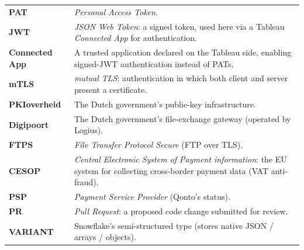 \begin{longtable}{@{}>{\bfseries}p{3.2cm} p{\dimexpr\textwidth-3.2cm-2\tabcolsep\relax}@{}}
PAT & \emph{Personal Access Token}. \\
JWT & \emph{JSON Web Token}: a signed token, used here via a Tableau \emph{Connected App} for authentication. \\
Connected App & A trusted application declared on the Tableau side, enabling signed-JWT authentication instead of PATs. \\
mTLS & \emph{mutual TLS}: authentication in which both client and server present a certificate. \\
PKIoverheid & The Dutch government's public-key infrastructure. \\
Digipoort & The Dutch government's file-exchange gateway (operated by Logius). \\
FTPS & \emph{File Transfer Protocol Secure} (FTP over TLS). \\
CESOP & \emph{Central Electronic System of Payment information}: the EU system for collecting cross-border payment data (VAT anti-fraud). \\
PSP & \emph{Payment Service Provider} (Qonto's status). \\
PR & \emph{Pull Request}: a proposed code change submitted for review. \\
VARIANT & Snowflake's semi-structured type (stores native JSON / arrays / objects). \\
\end{longtable}
